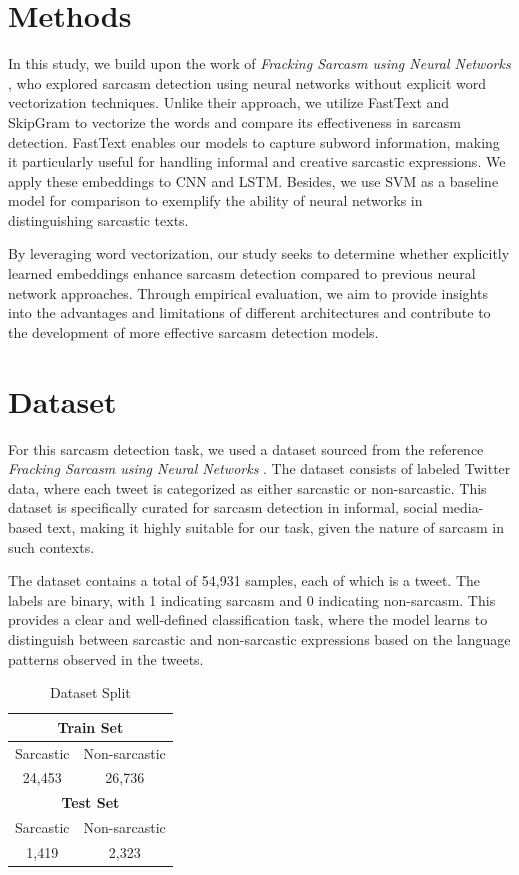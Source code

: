 \documentclass[11pt]{article}
\begin{document}
\section{Methods}
In this study, we build upon the work of \emph{Fracking Sarcasm using Neural Networks} \cite{ghosh2016magnets}, who explored sarcasm detection using neural networks without explicit word vectorization techniques. Unlike their approach, we utilize FastText and SkipGram to vectorize the words and compare its effectiveness in sarcasm detection. FastText enables our models to capture subword information, making it particularly useful for handling informal and creative sarcastic expressions. We apply these embeddings to CNN and LSTM. Besides, we use SVM as a baseline model for comparison to exemplify the ability of neural networks in distinguishing sarcastic texts.

By leveraging word vectorization, our study seeks to determine whether explicitly learned embeddings enhance sarcasm detection compared to previous neural network approaches. Through empirical evaluation, we aim to provide insights into the advantages and limitations of different architectures and contribute to the development of more effective sarcasm detection models.

\section{Dataset}
For this sarcasm detection task, we used a dataset sourced from the reference \emph{Fracking Sarcasm using Neural Networks} \cite{ghosh2016magnets}. The dataset consists of labeled Twitter data, where each tweet is categorized as either sarcastic or non-sarcastic. This dataset is specifically curated for sarcasm detection in informal, social media-based text, making it highly suitable for our task, given the nature of sarcasm in such contexts.

The dataset contains a total of 54,931 samples, each of which is a tweet. The labels are binary, with 1 indicating sarcasm and 0 indicating non-sarcasm. This provides a clear and well-defined classification task, where the model learns to distinguish between sarcastic and non-sarcastic expressions based on the language patterns observed in the tweets.

\begin{table}[ht]
\centering
\begin{tabular}{|c|c|}
\hline
\multicolumn{2}{|c|}{\textbf{Train Set}} \\ \hline
Sarcastic & Non-sarcastic \\ \hline
24,453 & 26,736 \\ \hline
\multicolumn{2}{|c|}{\textbf{Test Set}} \\ \hline
Sarcastic & Non-sarcastic \\ \hline
1,419 & 2,323 \\ \hline
\end{tabular}
\caption{Dataset Split}
\end{table}
\end{document}
